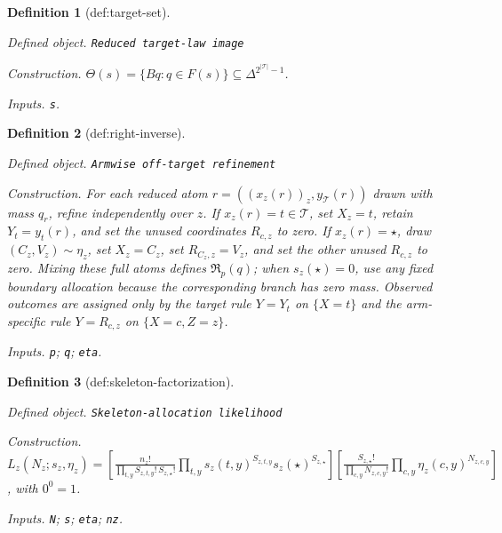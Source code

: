 \documentclass{article}
\newtheorem{definition}{Definition}
\begin{document}
\begin{definition}[def:target-set]\label{def:target-set}
\par\smallskip\noindent\emph{Defined object.} \texttt{Reduced target-\allowbreak{}law image}
\par\smallskip\noindent\emph{Construction.} \(\Theta(s)=\{Bq:q\in F(s)\}\subseteq\Delta^{2^{|\mathcal T|}-1}\).
\par\smallskip\noindent\emph{Inputs.} \texttt{s}.
\end{definition}

\begin{definition}[def:right-inverse]\label{def:right-inverse}
\par\smallskip\noindent\emph{Defined object.} \texttt{Armwise off-\allowbreak{}target refinement}
\par\smallskip\noindent\emph{Construction.} For each reduced atom \(r=((x_z(r))_z,y_{\mathcal T}(r))\) drawn with mass \(q_r\), refine independently over \(z\). If \(x_z(r)=t\in\mathcal T\), set \(X_z=t\), retain \(Y_t=y_t(r)\), and set the unused coordinates \(R_{c,z}\) to zero. If \(x_z(r)=\star\), draw \((C_z,V_z)\sim\eta_z\), set \(X_z=C_z\), set \(R_{C_z,z}=V_z\), and set the other unused \(R_{c,z}\) to zero. Mixing these full atoms defines \(\mathfrak R_p(q)\); when \(s_z(\star)=0\), use any fixed boundary allocation because the corresponding branch has zero mass. Observed outcomes are assigned only by the target rule \(Y=Y_t\) on \(\{X=t\}\) and the arm-specific rule \(Y=R_{c,z}\) on \(\{X=c,Z=z\}\).
\par\smallskip\noindent\emph{Inputs.} \texttt{p}; \texttt{q}; \texttt{eta}.
\end{definition}

\begin{definition}[def:skeleton-factorization]\label{def:skeleton-factorization}
\par\smallskip\noindent\emph{Defined object.} \texttt{Skeleton-\allowbreak{}allocation likelihood}
\par\smallskip\noindent\emph{Construction.} \(L_z(N_z;s_z,\eta_z)=\left[\frac{n_z!}{\prod_{t,y}S_{z,t,y}!\,S_{z,\star}!}\prod_{t,y}s_z(t,y)^{S_{z,t,y}}s_z(\star)^{S_{z,\star}}\right]\left[\frac{S_{z,\star}!}{\prod_{c,y}N_{z,c,y}!}\prod_{c,y}\eta_z(c,y)^{N_{z,c,y}}\right]\), with \(0^0=1\).
\par\smallskip\noindent\emph{Inputs.} \texttt{N}; \texttt{s}; \texttt{eta}; \texttt{nz}.
\end{definition}
\end{document}
